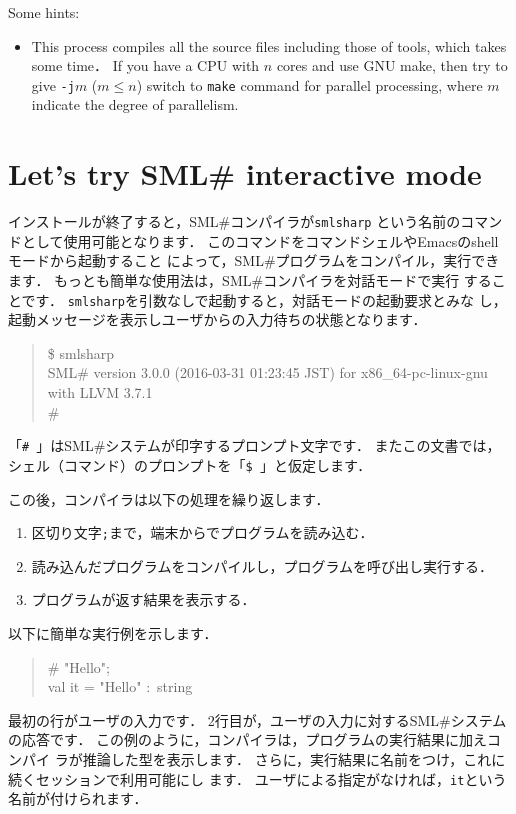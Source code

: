 \documentclass{jbook}
\newif\ifjp
\newcommand{\txt}[2]{#2}
\newcommand{\smlsharp}{SML\#}
\newcommand{\version}{3.0.0}
\newcommand{\releaseDate}{2016-03-31 01:23:45 JST}
\begin{document}
Some hints:
\begin{itemize}
\item 
	This process compiles all the source files including those of
tools, which takes some time．
	If you have a CPU with $n$ cores and use GNU make, then try to
give {\tt -j$m$} ($m \le n$) switch to {\tt make} command for
parallel processing, where $m$ indicate the degree of parallelism. 
\end{itemize}
\fi%

\section{
\txt{\smlsharp{}の対話型モードを使ってみよう}
    {Let's try \smlsharp{} interactive mode}}
\label{sec:tutorialInteractive}

\ifjp%

	インストールが終了すると，\smlsharp{}コンパイラが{\tt smlsharp}
という名前のコマンドとして使用可能となります．
	このコマンドをコマンドシェルやEmacsのshellモードから起動すること
によって，\smlsharp{}プログラムをコンパイル，実行できます．
	もっとも簡単な使用法は，\smlsharp{}コンパイラを対話モードで実行
することです．
	{\tt smlsharp}を引数なしで起動すると，対話モードの起動要求とみな
し，起動メッセージを表示しユーザからの入力待ちの状態となります．
\begin{tt}
\begin{quote}
\$ smlsharp\\
SML\# version \version{} (\releaseDate{}) for x86\_64-pc-linux-gnu with LLVM 3.7.1\\
\# 
\end{quote}
\end{tt}
	「{\tt \#\ }」は\smlsharp{}システムが印字するプロンプト文字です． 
	またこの文書では，シェル（コマンド）のプロンプトを「{\tt \$\ }」と仮定します．

	この後，コンパイラは以下の処理を繰り返します．
\begin{enumerate}
\item 区切り文字{\tt ;}まで，端末からでプログラムを読み込む．
\item 読み込んだプログラムをコンパイルし，プログラムを呼び出し実行する．
\item プログラムが返す結果を表示する．
\end{enumerate}
	以下に簡単な実行例を示します．
\begin{tt}
\begin{quote}
\# "Hello";\\
val it = "Hello" :~string
\end{quote}
\end{tt}
	最初の行がユーザの入力です．
	2行目が，ユーザの入力に対する\smlsharp{}システムの応答です．
	この例のように，コンパイラは，プログラムの実行結果に加えコンパイ
ラが推論した型を表示します．
	さらに，実行結果に名前をつけ，これに続くセッションで利用可能にし
ます．
	ユーザによる指定がなければ，{\tt it}という名前が付けられます．
\else%
\end{document}
